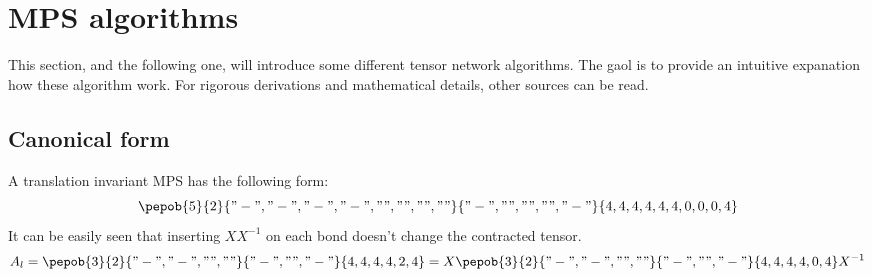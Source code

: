 
\section{MPS algorithms}

This section, and the following one, will introduce some different tensor network algorithms. The gaol is to provide an intuitive expanation how these algorithm work. For rigorous derivations and mathematical details, other sources can be read.

\subsection{Canonical form}

A translation invariant MPS has the following form:
\begin{equation}\label{mps:uni}
    \pepob{5}{2}{{
                "-","-", "-","-",
                "","","",""}}{{
                "-",
                "",
                "",
                "",
                "-"}}{{
                4,4,4,4,4,
                4,0,0,0,4}}
\end{equation}
It can be easily seen that inserting $X X^{-1}$ on each bond doesn't change the contracted tensor.
\begin{equation}
    A_l = \pepob{3}{2}{{
                "-","-",
                "",""}}{{
                "-",
                "",
                "-"}}{{
                4,4,4,
                4,2,4}}  =X \pepob{3}{2}{{
                "-","-",
                "",""}}{{
                "-",
                "",
                "-"}}{{
                4,4,4,
                4,0,4}} X^{-1}
\end{equation}

